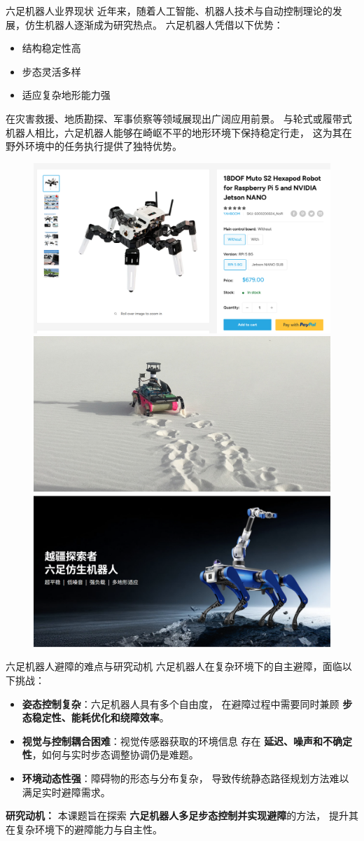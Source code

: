 \documentclass{beamer}
\begin{document}
\begin{frame}{六足机器人业界现状}
    近年来，随着人工智能、机器人技术与自动控制理论的发展，仿生机器人逐渐成为研究热点。
    六足机器人凭借以下优势：
    \begin{itemize}
        \item 结构稳定性高
        \item 步态灵活多样
        \item 适应复杂地形能力强
    \end{itemize}

    在灾害救援、地质勘探、军事侦察等领域展现出广阔应用前景。
    与轮式或履带式机器人相比，六足机器人能够在崎岖不平的地形环境下保持稳定行走，
    这为其在野外环境中的任务执行提供了独特优势。

    \begin{figure}[htpb]
        \centering
        \includegraphics[width=0.3\linewidth]{pic/muto s2.PNG}
        \includegraphics[width=0.3\linewidth]{pic/沙漠六足机器人.png}
        \includegraphics[width=0.3\linewidth]{pic/六足带机械臂狗.png}
    \end{figure}
\end{frame}

\begin{frame}{六足机器人避障的难点与研究动机}
    六足机器人在复杂环境下的自主避障，面临以下挑战：
    \begin{itemize}
        \item \textbf{姿态控制复杂}：六足机器人具有多个自由度，
              在避障过程中需要同时兼顾 \textbf{步态稳定性、能耗优化和绕障效率}。
        \item \textbf{视觉与控制耦合困难}：视觉传感器获取的环境信息
              存在 \textbf{延迟、噪声和不确定性}，如何与实时步态调整协调仍是难题。
        \item \textbf{环境动态性强}：障碍物的形态与分布复杂，
              导致传统静态路径规划方法难以满足实时避障需求。
    \end{itemize}

    \vspace{0.3cm}
    \textbf{研究动机：}  
    本课题旨在探索 \textbf{六足机器人多足步态控制并实现避障}的方法，
    提升其在复杂环境下的避障能力与自主性。
\end{frame}
\end{document}
